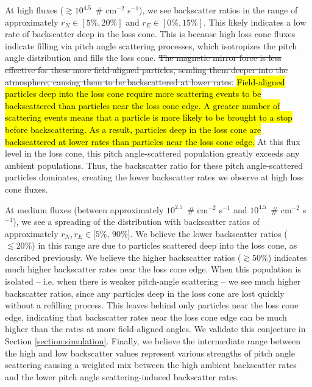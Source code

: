 \documentclass[draft]{agujournal2019}
\begin{document}
At high fluxes ($\gtrsim 10^{4.5}$~\# cm$^{-2}$ s$^{-1}$), we see backscatter ratios in the range of approximately $r_N \in [5\%, 20\%]$ and $r_E \in [0\%, 15\%]$. This likely indicates a low rate of backscatter deep in the loss cone. This is because high loss cone fluxes indicate filling via pitch angle scattering processes, which isotropizes the pitch angle distribution and fills the loss cone. \st{The magnetic mirror force is less effective for these more field-aligned particles, sending them deeper into the atmosphere, causing them to be backscattered at lower rates.} \hl{Field-aligned particles deep into the loss cone require more scattering events to be backscattered than particles near the loss cone edge. A greater number of scattering events means that a particle is more likely to be brought to a stop before backscattering. As a result, particles deep in the loss cone are backscattered at lower rates than particles near the loss cone edge.} At this flux level in the loss cone, this pitch angle-scattered population greatly exceeds any ambient populations. Thus, the backscatter ratio for these pitch angle-scattered particles dominates, creating the lower backscatter rates we observe at high loss cone fluxes.

At medium fluxes (between approximately $10^{2.5}$~\# cm$^{-2}$ s$^{-1}$ and $10^{4.5}$~\# cm$^{-2}$ s$^{-1}$), we see a spreading of the distribution with backscatter ratios of approximately $r_N, r_E \in [5\%$, $90\%]$. We believe the lower backscatter ratios ($\lesssim 20\%$) in this range are due to particles scattered deep into the loss cone, as described previously. We believe the higher backscatter ratios ($\gtrsim 50\%$) indicates much higher backscatter rates near the loss cone edge. When this population is isolated -- i.e. when there is weaker pitch-angle scattering -- we see much higher backscatter ratios, since any particles deep in the loss cone are lost quickly without a refilling process. This leaves behind only particles near the loss cone edge, indicating that backscatter rates near the loss cone edge can be much higher than the rates at more field-aligned angles. We validate this conjecture in Section \ref{section:simulation}. Finally, we believe the intermediate range between the high and low backscatter values represent various strengths of pitch angle scattering causing a weighted mix between the high ambient backscatter rates and the lower pitch angle scattering-induced backscatter rates.
\end{document}
